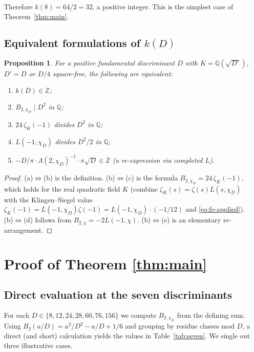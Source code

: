 \documentclass[11pt,reqno]{amsart}
\theoremstyle{plain}
\newtheorem{proposition}[theorem]{Proposition}
\theoremstyle{definition}
\newcommand{\Q}{\mathbb{Q}}
\newcommand{\Z}{\mathbb{Z}}
\begin{document}
Therefore $k(8)=64/2=32$, a positive integer.  This is the simplest
case of Theorem~\ref{thm:main}.

\subsection{Equivalent formulations of $k(D)$}\label{ssec:equivalent}

\begin{proposition}\label{prop:equiv}
For a positive fundamental discriminant $D$ with $K=\Q(\sqrt{D'})$,
$D'=D$ or $D/4$ square-free, the following are equivalent:
\begin{enumerate}
\item[(a)] $k(D)\in\Z$;
\item[(b)] $B_{2,\chi_{D}}\mid D^{2}$ in $\Q$;
\item[(c)] $24\,\zeta_{K}(-1)$ divides $D^{2}$ in $\Q$;
\item[(d)] $L(-1,\chi_{D})$ divides $D^{2}/2$ in $\Q$;
\item[(e)] $-D/\pi\cdot\Lambda(2,\chi_{D})^{-1}\cdot\pi\sqrt{D}\in\Z$ (a
re-expression via completed $L$).
\end{enumerate}
\end{proposition}

\begin{proof}
(a)$\Leftrightarrow$(b) is the definition.  (b)$\Leftrightarrow$(c) is
the formula $B_{2,\chi_{D}}=24\,\zeta_{K}(-1)$, which holds for the
real quadratic field $K$ (combine
$\zeta_{K}(s)=\zeta(s)L(s,\chi_{D})$ with the Klingen--Siegel value
$\zeta_{K}(-1)=L(-1,\chi_{D})\zeta(-1)=L(-1,\chi_{D})\cdot(-1/12)$
and \eqref{eq:fe-applied}).  (b)$\Leftrightarrow$(d) follows from
$B_{2,\chi}=-2L(-1,\chi)$.  (b)$\Leftrightarrow$(e) is an
elementary re-arrangement.
\end{proof}

\section{Proof of Theorem \ref{thm:main}}\label{sec:proof}

\subsection{Direct evaluation at the seven discriminants}
For each $D\in\{8,12,24,28,60,76,156\}$ we compute $B_{2,\chi_{D}}$
from the defining sum.  Using
$B_{2}(a/D)=a^{2}/D^{2}-a/D+1/6$ and grouping by residue classes mod
$D$, a direct (and short) calculation yields the values in
Table~\ref{tab:seven}.  We single out three illustrative cases.
\end{document}

